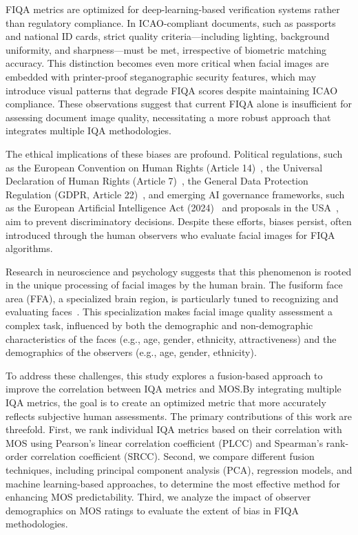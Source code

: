 FIQA metrics are optimized for deep-learning-based verification systems rather than regulatory compliance. In ICAO-compliant documents, such as passports and national ID cards, strict quality criteria—including lighting, background uniformity, and sharpness—must be met, irrespective of biometric matching accuracy. This distinction becomes even more critical when facial images are embedded with printer-proof steganographic security features, which may introduce visual patterns that degrade FIQA scores despite maintaining ICAO compliance. These observations suggest that current FIQA alone is insufficient for assessing document image quality, necessitating a more robust approach that integrates multiple IQA methodologies.

The ethical implications of these biases are profound. Political regulations, such as the European Convention on Human Rights (Article 14)~\cite{echr_article14}, the Universal Declaration of Human Rights (Article 7)~\cite{udhr_article7}, the General Data Protection Regulation (GDPR, Article 22)~\cite{gdpr_article22}, and emerging AI governance frameworks, such as the European Artificial Intelligence Act (2024)~\cite{eu_ai_act_2024} and proposals in the USA~\cite{us_ai_bill_rights_2022}, aim to prevent discriminatory decisions. Despite these efforts, biases persist, often introduced through the human observers who evaluate facial images for FIQA algorithms.

Research in neuroscience and psychology suggests that this phenomenon is rooted in the unique processing of facial images by the human brain. The fusiform face area (FFA), a specialized brain region, is particularly tuned to recognizing and evaluating faces~\cite{kanwisher2006fusiform, tsao2008mechanisms}. This specialization makes facial image quality assessment a complex task, influenced by both the demographic and non-demographic characteristics of the faces (e.g., age, gender, ethnicity, attractiveness) and the demographics of the observers (e.g., age, gender, ethnicity).

To address these challenges, this study explores a fusion-based approach to improve the correlation between IQA metrics and MOS.\@ By integrating multiple IQA metrics, the goal is to create an optimized metric that more accurately reflects subjective human assessments. The primary contributions of this work are threefold. First, we rank individual IQA metrics based on their correlation with MOS using Pearson's linear correlation coefficient (PLCC) and Spearman's rank-order correlation coefficient (SRCC). Second, we compare different fusion techniques, including principal component analysis (PCA), regression models, and machine learning-based approaches, to determine the most effective method for enhancing MOS predictability. Third, we analyze the impact of observer demographics on MOS ratings to evaluate the extent of bias in FIQA methodologies. 

